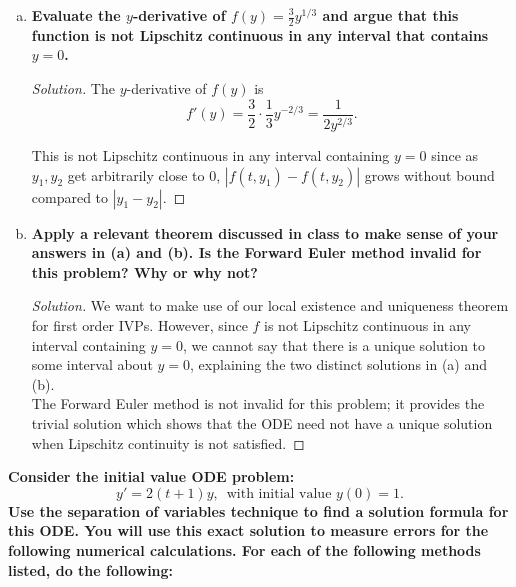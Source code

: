 \documentclass[11pt]{article}
\newenvironment{solution}
  {\renewcommand\qedsymbol{$\blacksquare$}\begin{proof}[Solution]}
  {\end{proof}}
\theoremstyle{definition}
\begin{document}
\begin{enumerate}
\begin{enumerate}[a)]
\begin{solution}
        Dividing both sides by $\frac{3}{2}$ and raising both sides to the power of $\frac{3}{2}$, we get the solution \[y = t^{\frac{3}{2}}.\]

        Since we do see that this solution satisfies the intial value $y(0) = 0$, we find that the solution to the IVP is $\boxed{y' = t^{\frac{3}{2}}}.$
        \end{solution}
        \item \textbf{Evaluate the $y$-derivative of $f(y) = \frac{3}{2}y^{1/3}$ and argue that this function is not Lipschitz continuous in any interval that contains $y=0$.}
        
        \begin{solution}
        The $y$-derivative of $f(y)$ is 
        \[ f'(y) = \frac{3}{2} \cdot \frac{1}{3} y^{-2/3} = \frac{1}{2y^{2/3}}.\]

        This is not Lipschitz continuous in any interval containing $y=0$ since as $y_1, y_2$ get arbitrarily close to $0$, $|f(t, y_1) - f(t, y_2)|$ grows without bound compared to $|y_1 - y_2|.$
        \end{solution}
        \item \textbf{Apply a relevant theorem discussed in class to make sense of your answers in (a) and (b). Is the Forward Euler method invalid for this problem? Why or why not?}
        \begin{solution}
        We want to make use of our local existence and uniqueness theorem for first order IVPs. However, since $f$ is not Lipschitz continuous in any interval containing $y=0$, we cannot say that there is a unique solution to some interval about $y=0$, explaining
        the two distinct solutions in (a) and (b). \\

        The Forward Euler method is not invalid for this problem; it provides the trivial solution which shows that the ODE need not have a unique solution when Lipschitz continuity is not satisfied.
    \end{solution}
    \end{enumerate}

    \newpage

    \textbf{Consider the initial value ODE problem: \[y' = 2(t+1)y, \, \text{ with initial value } y(0) = 1.\] Use the separation of variables technique
    to find a solution formula for this ODE. You will use this exact solution to measure errors for the following numerical calculations. For each of the following methods listed, do the following:}


\end{enumerate}
\end{document}
